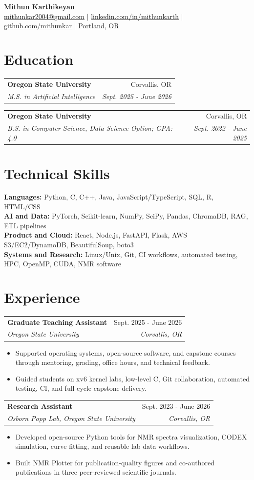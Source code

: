 \documentclass[letterpaper,10pt]{article}
\newcommand{\entry}[4]{
  \begin{tabularx}{\textwidth}{Xr}
    \textbf{#1} & #2 \\
    \textit{#3} & \textit{#4}
  \end{tabularx}\vspace{-3pt}
}
\newenvironment{tightitems}{
  \begin{itemize}[leftmargin=0.18in, topsep=2pt, itemsep=0pt, parsep=0pt, partopsep=0pt]
}{
  \end{itemize}\vspace{-2pt}
}
\begin{document}
\begin{center}
  {\LARGE\textbf{Mithun Karthikeyan}}\\[3pt]
  \href{mailto:mithunkar2004@gmail.com}{mithunkar2004@gmail.com}
  $|$ \href{https://linkedin.com/in/mithunkarth}{linkedin.com/in/mithunkarth}
  $|$ \href{https://github.com/mithunkar}{github.com/mithunkar}
  $|$ Portland, OR
\end{center}
\vspace{-10pt}

\section{Education}
\entry{Oregon State University}{Corvallis, OR}{M.S. in Artificial Intelligence}{Sept. 2025 - June 2026}
\entry{Oregon State University}{Corvallis, OR}{B.S. in Computer Science, Data Science Option; GPA: 4.0}{Sept. 2022 - June 2025}

\section{Technical Skills}
\textbf{Languages:} Python, C, C++, Java, JavaScript/TypeScript, SQL, R, HTML/CSS \\
\textbf{AI and Data:} PyTorch, Scikit-learn, NumPy, SciPy, Pandas, ChromaDB, RAG, ETL pipelines \\
\textbf{Product and Cloud:} React, Node.js, FastAPI, Flask, AWS S3/EC2/DynamoDB, BeautifulSoup, boto3 \\
\textbf{Systems and Research:} Linux/Unix, Git, CI workflows, automated testing, HPC, OpenMP, CUDA, NMR software

\section{Experience}
\entry{Graduate Teaching Assistant}{Sept. 2025 - June 2026}{Oregon State University}{Corvallis, OR}
\begin{tightitems}
  \item Supported operating systems, open-source software, and capstone courses through mentoring, grading, office hours, and technical feedback.
  \item Guided students on xv6 kernel labs, low-level C, Git collaboration, automated testing, CI, and full-cycle capstone delivery.
\end{tightitems}

\entry{Research Assistant}{Sept. 2023 - June 2026}{Osborn Popp Lab, Oregon State University}{Corvallis, OR}
\begin{tightitems}
  \item Developed open-source Python tools for NMR spectra visualization, CODEX simulation, curve fitting, and reusable lab data workflows.
  \item Built NMR Plotter for publication-quality figures and co-authored publications in three peer-reviewed scientific journals.
\end{tightitems}
\end{document}
